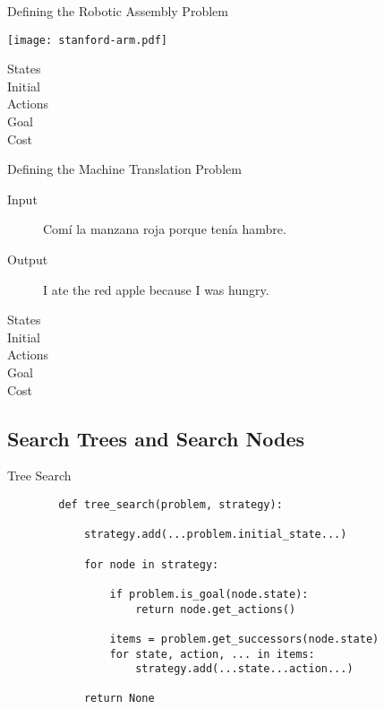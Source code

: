 \documentclass[14pt]{beamer}
\begin{document}
\begin{frame}{Defining the Robotic Assembly Problem}
	\begin{center}
		\texttt{[image: stanford-arm.pdf]}
	\end{center}
	\begin{description}
		\item[States] 
		\item[Initial] 
		\item[Actions] 
		\item[Goal] 
		\item[Cost] 
	\end{description}
\end{frame}

\begin{frame}{Defining the Machine Translation Problem}
	\begin{description}
		\item[Input] Com\'i la manzana roja porque ten\'ia hambre.
		\item[Output] I ate the red apple because I was hungry.
		\bigskip\bigskip
		\item[States]
		\item[Initial]
		\item[Actions]
		\item[Goal]
		\item[Cost]
	\end{description}
\end{frame}

\subsection{Search Trees and Search Nodes}

\begin{frame}[fragile]{Tree Search}
	\footnotesize
	\begin{lstlisting}
		def tree_search(problem, strategy):

		    strategy.add(...problem.initial_state...)

		    for node in strategy:

		        if problem.is_goal(node.state):
		            return node.get_actions()

		        items = problem.get_successors(node.state)
		        for state, action, ... in items:
		            strategy.add(...state...action...)

		    return None
	\end{lstlisting}
\end{frame}
\end{document}

